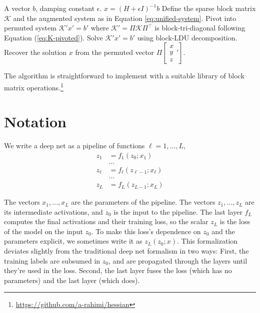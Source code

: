 \documentclass{article}
\begin{document}
\begin{algorithm}\label{alg:hessian_inverse_product}
  \caption{Compute the hessian-inverse-vector product by solving $(H+\epsilon I)x=b$.}
  \label{alg:hessian_inverse}
  \begin{algorithmic}[1]
    \Require A vector $b$, damping constant $\epsilon$.
    \Ensure $x = (H+\epsilon I)^{-1} b$
    \State Define the sparse block matrix $\mathcal{K}$ and the augmented system as in Equation \ref{eq:unified-system}.
    \State Pivot into permuted system $\mathcal{K}' x' = b'$ where $\mathcal{K}' = \Pi \mathcal{K} \Pi^\top$ is block-tri-diagonal following Equation (\ref{eq:K-pivoted}).
    \State Solve $\mathcal{K}' x' = b'$ using block-LDU decomposition.
    \State Recover the solution $x$ from the permuted vector $\Pi \left[\begin{smallmatrix}x \\ y \\ z\end{smallmatrix}'\right]$.
  \end{algorithmic}
\end{algorithm}

The algorithm is straightforward to implement with a suitable library of
block matrix operations.\footnote{\url{https://github.com/a-rahimi/hessian}}

\section{Notation}

We write a deep net as a pipeline of functions $\ell = 1, \ldots, L$,
\begin{align}
  z_1    & = f_1(z_0; x_1) \nonumber              \\
         & \ldots \nonumber                       \\
  z_\ell & = f_\ell(z_{\ell-1}; x_\ell) \nonumber \\
         & \ldots \nonumber                       \\
  z_L    & = f_L(z_{L-1}; x_L)
\end{align}

The vectors $x_1,\ldots, x_L$ are the parameters of the pipeline. The vectors $z_1,\ldots, z_L$ are its intermediate
activations, and $z_0$ is the input to the pipeline. The last layer $f_L$ computes the final activations and their
training loss, so the scalar $z_L$ is the loss of the model on the input $z_0$. To make this loss's dependence on $z_0$
and the parameters explicit, we sometimes write it as $z_L(z_0;x)$. This formalization deviates slightly from the
traditional deep net formalism in two ways: First, the training labels are subsumed in $z_0$, and are propagated
through the layers until they're used in the loss. Second, the last layer fuses the loss (which has no parameters) and
the last layer (which does).
\end{document}
